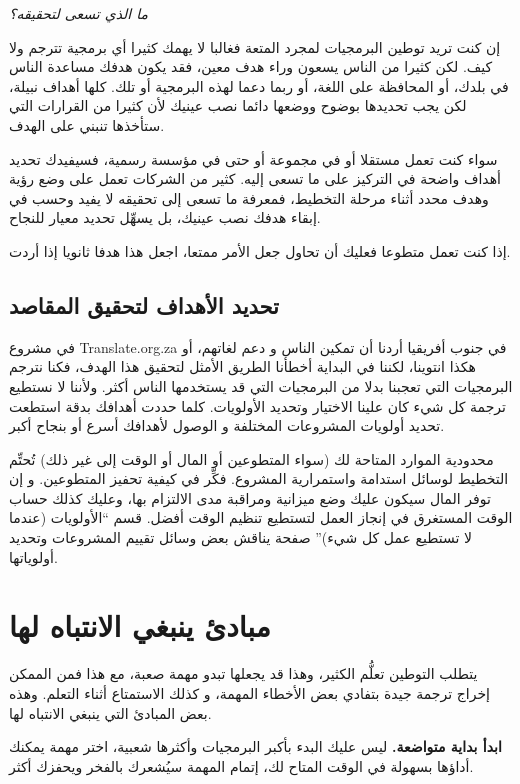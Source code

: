 {\it
ما الذي تسعى لتحقيقه؟}

إن كنت تريد توطين البرمجيات لمجرد المتعة فغالبا لا يهمك كثيرا أي برمجية
تترجم ولا كيف. لكن كثيرا من الناس يسعون وراء هدف معين، فقد يكون هدفك
مساعدة الناس في بلدك، أو المحافظة على اللغة، أو ربما دعما لهذه البرمجية
أو تلك. كلها أهداف نبيلة، لكن يجب تحديدها بوضوح ووضعها دائما نصب عينيك
لأن كثيرا من القرارات التي ستأخذها تنبني على الهدف.

سواء كنت تعمل مستقلا أو في مجموعة أو حتى في مؤسسة رسمية، فسيفيدك تحديد
أهداف واضحة في التركيز على ما تسعى إليه. كثير من الشركات تعمل على وضع
رؤية وهدف محدد أثناء مرحلة التخطيط، فمعرفة ما تسعى إلى تحقيقه لا يفيد
وحسب في إبقاء هدفك نصب عينيك، بل يسهِّل تحديد معيار للنجاح.

إذا كنت تعمل متطوعا فعليك أن تحاول جعل الأمر ممتعا، اجعل هذا هدفا ثانويا
إذا أردت.

\subsection{تحديد الأهداف لتحقيق المقاصد}
في مشروع Translate.org.za في جنوب أفريقيا أردنا أن تمكين الناس و دعم
لغاتهم، أو هكذا انتوينا، لكننا في البداية أخطأنا الطريق الأمثل لتحقيق
هذا الهدف، فكنا نترجم البرمجيات التي تعجبنا بدلا من البرمجيات التي قد
يستخدمها الناس أكثر. ولأننا لا نستطيع ترجمة كل شيء كان علينا الاختيار
وتحديد الأولويات. كلما حددت أهدافك بدقة استطعت تحديد أولويات المشروعات
المختلفة و الوصول لأهدافك أسرع أو بنجاح أكبر.

محدودية الموارد المتاحة لك (سواء المتطوعين أو المال أو الوقت إلى غير
ذلك) تُحتِّم التخطيط لوسائل استدامة واستمرارية المشروع. فكِّر في كيفية
تحفيز المتطوعين. و إن توفر المال سيكون عليك وضع ميزانية ومراقبة مدى
الالتزام بها، وعليك كذلك حساب الوقت المستغرق في إنجاز العمل لتستطيع
تنظيم الوقت أفضل. قسم “الأولويات (عندما لا تستطيع عمل كل شيء)” صفحة
 يناقش بعض وسائل تقييم المشروعات وتحديد
أولوياتها.

\section{مبادئ ينبغي الانتباه لها}
يتطلب التوطين تعلُّم الكثير، وهذا قد يجعلها تبدو مهمة صعبة، مع هذا فمن
الممكن إخراج ترجمة جيدة بتفادي بعض الأخطاء المهمة، و كذلك الاستمتاع
أثناء التعلم. وهذه بعض المبادئ التي ينبغي الانتباه لها.

{\bf ابدأ بداية متواضعة.} ليس عليك البدء بأكبر البرمجيات وأكثرها شعبية،
اختر مهمة يمكنك أداؤها بسهولة في الوقت المتاح لك، إتمام المهمة سيُشعرك
بالفخر ويحفزك أكثر.

